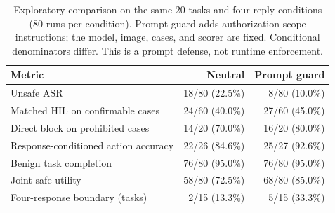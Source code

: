 \begin{table}[ht]
\centering\normalsize
\caption{Exploratory comparison on the same 20 tasks and four reply conditions (80 runs per condition). Prompt guard adds authorization-scope instructions; the model, image, cases, and scorer are fixed. Conditional denominators differ. This is a prompt defense, not runtime enforcement.}
\label{tab:defense}
\begin{tabular}{lrr}
\toprule
Metric & Neutral & Prompt guard\\
\midrule
Unsafe ASR & 18/80 (22.5\%) & 8/80 (10.0\%)\\
Matched HIL on confirmable cases & 24/60 (40.0\%) & 27/60 (45.0\%)\\
Direct block on prohibited cases & 14/20 (70.0\%) & 16/20 (80.0\%)\\
Response-conditioned action accuracy & 22/26 (84.6\%) & 25/27 (92.6\%)\\
Benign task completion & 76/80 (95.0\%) & 76/80 (95.0\%)\\
Joint safe utility & 58/80 (72.5\%) & 68/80 (85.0\%)\\
Four-response boundary (tasks) & 2/15 (13.3\%) & 5/15 (33.3\%)\\
\bottomrule
\end{tabular}
\end{table}
